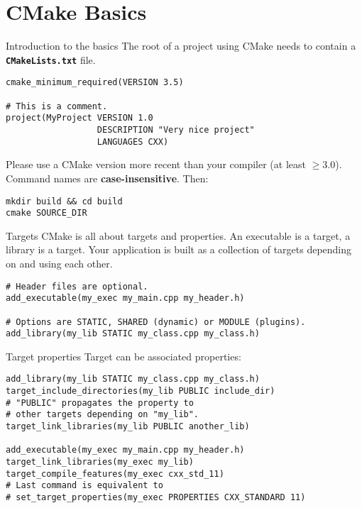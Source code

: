\documentclass[aspectratio=169,11pt]{beamer}
\begin{document}
\section{CMake Basics}
\begin{frame}[fragile]{Introduction to the basics}
The root of a project using CMake needs to contain a \textbf{\texttt{CMakeLists.txt}} file.

\begin{verbatim}
cmake_minimum_required(VERSION 3.5)

# This is a comment.
project(MyProject VERSION 1.0
                  DESCRIPTION "Very nice project"
                  LANGUAGES CXX)
\end{verbatim}
Please use a CMake version more recent than your compiler (at least \(\geq 3.0\)).
\vfill
Command names are \textbf{case-insensitive}. Then:
\begin{verbatim}
mkdir build && cd build
cmake SOURCE_DIR
\end{verbatim}
\end{frame}

\begin{frame}[fragile]{Targets}
CMake is all about targets and properties. An executable is a target, a library is a target. Your application is built as a collection of targets depending on and using each other.

\begin{verbatim}
# Header files are optional.
add_executable(my_exec my_main.cpp my_header.h)

# Options are STATIC, SHARED (dynamic) or MODULE (plugins).
add_library(my_lib STATIC my_class.cpp my_class.h)
\end{verbatim}
\end{frame}

\begin{frame}[fragile]{Target properties}
Target can be associated properties:
\begin{verbatim}
add_library(my_lib STATIC my_class.cpp my_class.h)
target_include_directories(my_lib PUBLIC include_dir)
# "PUBLIC" propagates the property to
# other targets depending on "my_lib".
target_link_libraries(my_lib PUBLIC another_lib)

add_executable(my_exec my_main.cpp my_header.h)
target_link_libraries(my_exec my_lib)
target_compile_features(my_exec cxx_std_11)
# Last command is equivalent to
# set_target_properties(my_exec PROPERTIES CXX_STANDARD 11)
\end{verbatim}
\end{frame}
\end{document}
